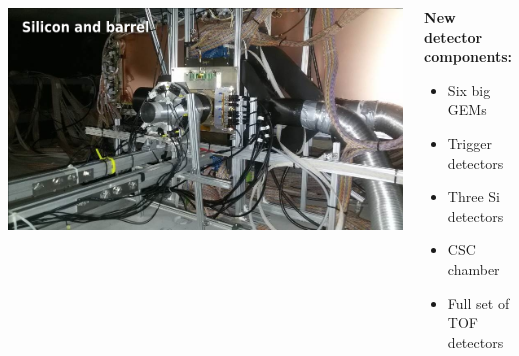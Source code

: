 \documentclass[dvipsnames] {beamer}
\begin{document}
\begin{frame}
\begin{columns}[t]
      \includegraphics[width=1.\linewidth]{Si_and_Barrel.jpg} \\
    {\footnotesize
       \begin{block}{\bf \centering New detector components:}
         \begin{itemize}
         \item Six big GEMs
         \item Trigger detectors
         \item Three Si detectors
         \item CSC chamber
         \item Full set of TOF detectors         
         \end{itemize}
       \end{block}
     }
  \end{columns}
\end{frame}
\end{document}
